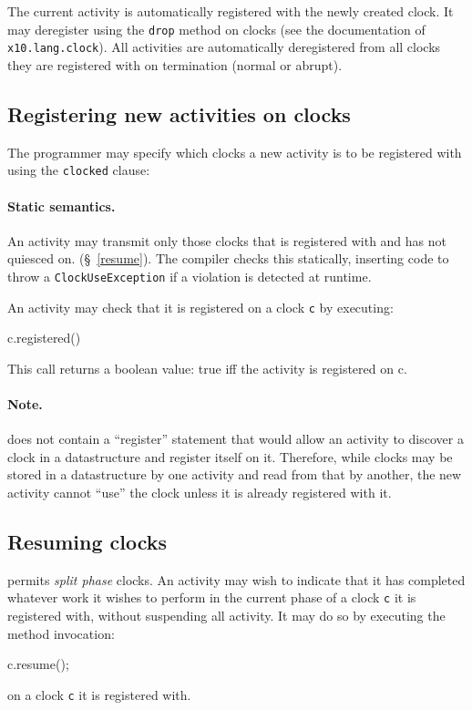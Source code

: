 The current activity is automatically registered with the newly
created clock.  It may deregister using the {\tt drop} method on
clocks (see the documentation of {\tt x10.lang.clock}). All activities
are automatically deregistered from all clocks they are registered
with on termination (normal or abrupt).

\subsection{Registering new activities on clocks}

The programmer may specify which clocks a new activity is to be registered with using the {\tt clocked} clause:
\begin{x10}
\end{x10}


\paragraph{Static semantics.} An activity may 
transmit only those clocks that is registered with and has not
quiesced on.  (\S~\ref{resume}). The compiler checks this
statically, inserting code to throw a {\tt ClockUseException}
if a violation is detected at runtime.

An activity may check that it is registered on a clock {\tt c} by
executing:
\begin{x10}
c.registered()
\end{x10}
\noindent This call returns a {\cf boolean} value: {\cf true} iff the
activity is registered on {\cf c}.

\paragraph{Note.} 
\Xten{} does not contain a ``register'' statement that would allow an
activity to discover a clock in a datastructure and register itself on
it. Therefore, while clocks may be stored in a datastructure by one
activity and read from that by another, the new activity cannot
``use'' the clock unless it is already registered with it.


\subsection{Resuming clocks}\label{resume}
\Xten{} permits {\em split phase} clocks. An activity may wish
to indicate that it has completed whatever work it wishes to perform
in the current phase of a  clock {\tt c} it is registered with, without
suspending all activity. It may do so  by executing the method
invocation:
\begin{x10}
  c.resume();
\end{x10}
\noindent on a clock {\tt c} it is registered with.  

